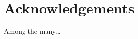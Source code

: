 \documentclass[a4paper,11pt]{combine}
\begin{document}
\section{Acknowledgements}      %
Among the many\dots


%
%
%
%




% 
% 
\end{document}
